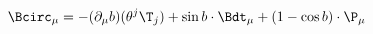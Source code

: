 \begin{equation}
\label{e5:63}
\Bcirc_{\mu} = -(\partial_{\mu}b)(\theta^j \T_j)+ \sin b \cdot \Bdt_{\mu}+ (1-\cos b)\cdot \P_{\mu}
\end{equation}

